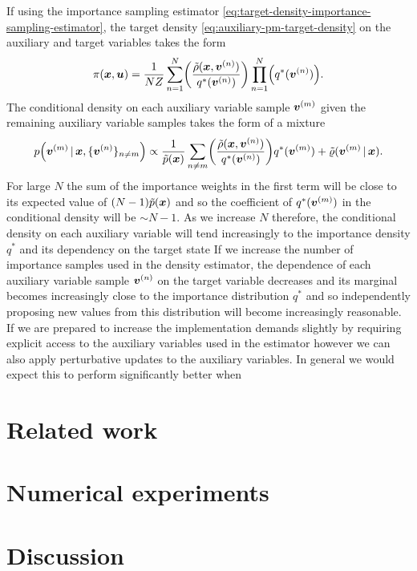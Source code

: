 If using the importance sampling estimator \eqref{eq:target-density-importance-sampling-estimator}, the target density \eqref{eq:auxiliary-pm-target-density} on the auxiliary and target variables takes the form
\begin{equation}
  \pi(\vct{x},\vct{u}) = \frac{1}{NZ} 
  \sum_{n=1}^N\lpa \frac{\tilde{\rho}(\vct{x},\vct{v}^{(n)})}{q^*(\vct{v}^{(n)})}  \rpa
  \prod_{n=1}^N \lpa q^*(\vct{v}^{(n)}) \rpa.
\end{equation}
The conditional density on each auxiliary variable sample $\boldsymbol{v}^{(m)}$ given the remaining auxiliary variable samples takes the form of a mixture
\begin{equation*}
  p\lpa\vct{v}^{(m)} \gvn \vct{x},\lbrace \vct{v}^{(n)} \rbrace_{n\neq m} \rpa \propto 
  \frac{1}{\utgtdens(\vct{x})}\sum_{n\neq m}\lpa \frac{\tilde{\rho}(\vct{x},\vct{v}^{(n)})}{q^*(\vct{v}^{(n)})}  \rpa q^*(\vct{v}^{(m)}) +
  \tilde{\varrho}(\vct{v}^{(m)}\gvn\vct{x}).
\end{equation*}
For large $N$ the sum of the importance weights in the first term will be close to its expected value of $(N-1)  \tilde{p}(\boldsymbol{x})$ and so the coefficient of $q^*(\boldsymbol{v}^{(m)})$ in the conditional density will be $\sim N-1$. As we increase $N$ therefore, the conditional density on each auxiliary variable will tend increasingly to the importance density $q^*$ and its dependency on the target state
If we increase the number of importance samples used in the density estimator, the dependence of each auxiliary variable sample $\boldsymbol{v}^{(n)}$ on the target variable decreases and its marginal becomes increasingly close to the importance distribution $q^*$ and so independently proposing new values from this distribution will become increasingly reasonable. If we are prepared to increase the implementation demands slightly by requiring explicit access to the auxiliary variables used in the estimator however we can also apply perturbative updates to the auxiliary variables. In general we would expect this to perform significantly better when


\section{Related work}


\section{Numerical experiments}

\section{Discussion}